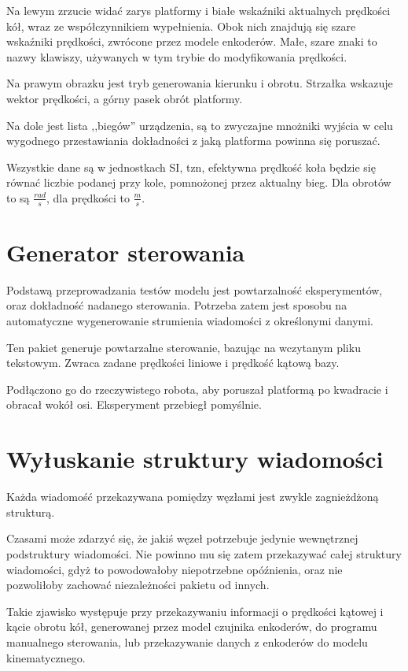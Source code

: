 	Na lewym zrzucie widać zarys platformy i białe wskaźniki aktualnych prędkości kół, wraz ze współczynnikiem wypełnienia.
	Obok nich znajdują się szare wskaźniki prędkości, zwrócone przez modele enkoderów.
	Małe, szare znaki to nazwy klawiszy, używanych w tym trybie do modyfikowania prędkości.
	
	Na prawym obrazku jest tryb generowania kierunku i obrotu. Strzałka wskazuje wektor prędkości, a górny pasek obrót platformy.
	
	Na dole jest lista ,,biegów'' urządzenia, są to zwyczajne mnożniki wyjścia w celu wygodnego przestawiania dokładności z jaką platforma powinna się poruszać.
	
	Wszystkie dane są w jednostkach SI, tzn, efektywna prędkość koła będzie się równać liczbie podanej przy kole, pomnożonej przez aktualny bieg.
	Dla obrotów to są $\frac{rad}{s}$, dla prędkości to $\frac{m}{s}$.
	
\section{Generator sterowania}
	\label{sec:gramofon}
	Podstawą przeprowadzania testów modelu jest powtarzalność eksperymentów, oraz dokładność nadanego sterowania.
	Potrzeba zatem jest sposobu na automatyczne wygenerowanie strumienia wiadomości z określonymi danymi.
	
	Ten pakiet generuje powtarzalne sterowanie, bazując na wczytanym pliku tekstowym.
	Zwraca zadane prędkości liniowe i prędkość kątową bazy.
	
	Podłączono go do rzeczywistego robota, aby poruszał platformą po kwadracie i obracał wokół osi.
	Eksperyment przebiegł pomyślnie.
		
\section{Wyłuskanie struktury wiadomości}
	\label{sec:dziadzio}
	Każda wiadomość przekazywana pomiędzy węzłami jest zwykle zagnieżdżoną strukturą.
	
	Czasami może zdarzyć się, że jakiś węzeł potrzebuje jedynie wewnętrznej podstruktury wiadomości.
	Nie powinno mu się zatem przekazywać całej struktury wiadomości, gdyż to powodowałoby niepotrzebne opóźnienia, oraz nie pozwoliłoby zachować niezależności 
	pakietu od innych.
	
	Takie zjawisko występuje przy przekazywaniu informacji o prędkości kątowej i kącie obrotu kół, generowanej przez model czujnika enkoderów, do programu
	manualnego sterowania, lub przekazywanie danych z enkoderów do modelu kinematycznego.
	
